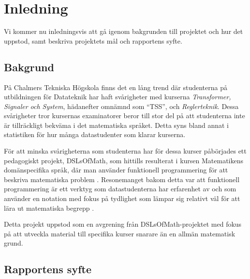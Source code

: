 \documentclass[]{article}
\begin{document}
\newpage
\tableofcontents

\newpage

\printglossary[title=Ordlista,nonumberlist]

\newpage

\setlength{\parskip}{2mm}
\setlength{\parindent}{0pt}


\section{Inledning}
Vi kommer nu inledningsvis att gå igenom bakgrunden till projektet och hur det
uppstod, samt beskriva projektets mål och rapportens syfte.

\subsection{Bakgrund}
%

På Chalmers Tekniska Högskola finns det en lång trend där
studenterna på utbildningen för Datateknik har haft svårigheter
med kurserna \textit{Transformer, Signaler och System}, hädanefter omnämnd
som ``\gls{TSS}'', och \textit{Reglerteknik}.
Dessa svårigheter tror kursernas examinatorer beror till stor del på att
studenterna inte är tillräckligt bekväma i det matematiska språket.
Detta syns bland annat i statistiken för hur många datastudenter som
klarar kurserna.

För att minska svårigheterna som studenterna har för dessa kurser påbörjades
ett pedagogiskt projekt, DSLsOfMath, som hittills resulterat i kursen
Matematikens domänspecifika språk, där man använder funktionell
programmering för att beskriva matematiska problem \cite{kursplan:dslsofmath}.
Resonemanget bakom detta var att funktionell programmering är ett verktyg
som datastudenterna har erfarenhet av och som använder en notation med
fokus på tydlighet som lämpar sig relativt väl för att lära ut matematiska
begrepp \cite{TFPIE15_DSLsofMath_IonescuJansson}.

Detta projekt uppstod som en avgrening från DSLsOfMath-projektet med fokus på
att utveckla material till specifika kurser snarare än en allmän matematisk
grund.

\subsection{Rapportens syfte}
\end{document}
